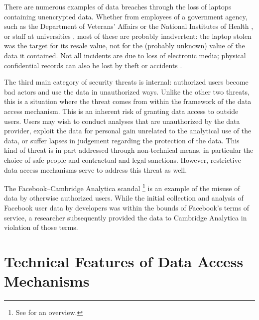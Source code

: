 
\begin{bbox}

There are numerous examples of data breaches through the loss of laptops containing unencrypted data. Whether from employees of a government agency, such as the Department of Veterans' Affairs \citep{bosworth2006} or the National Institutes of Health \citep{greenemeier2008}, or staff at universities \citep{stanfordreport2008}, most of these are probably inadvertent: the laptop stolen was the target for its resale value, not for the (probably unknown) value of the data it contained. Not all incidents are due to loss of electronic media; physical confidential records can also be lost by theft or accidents \citep{cbcnews2019}.

\end{bbox}


The third main category of security threats is internal: authorized users become bad actors and use the data in unauthorized ways. Unlike the other two threats, this is a situation where the threat comes from within the framework of the data access mechanism. This is an inherent risk of granting data access to outside users. Users may wish to conduct analyses that are unauthorized by the data provider, exploit the data for personal gain unrelated to the analytical use of the data, or suffer lapses in judgement regarding the protection of the data. This kind of threat is in part addressed through non-technical means, in particular the choice of safe people and contractual and legal sanctions. However, restrictive data access mechanisms serve to address this threat as well.


\begin{bbox}

The Facebook--Cambridge Analytica scandal \footnote{See \citet{confessore2018} for an overview.} is an example of the misuse of data by otherwise authorized users. While the initial collection and analysis of Facebook user data by developers was within the bounds of Facebook's terms of service, a researcher subsequently provided the data to Cambridge Analytica in violation of those terms.

\end{bbox}


\hypertarget{technical-features-of-data-access-mechanisms}{%
\section{Technical Features of Data Access Mechanisms}\label{technical-features-of-data-access-mechanisms}}

